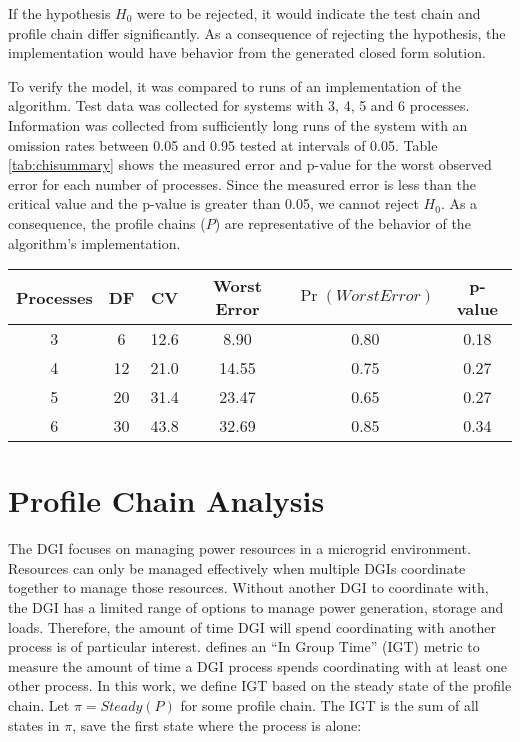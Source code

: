 If the hypothesis $H_{0}$ were to be rejected, it would indicate the test chain and profile chain differ significantly.
As a consequence of rejecting the hypothesis, the implementation would have behavior from the generated closed form solution.

To verify the model, it was compared to runs of an implementation of the algorithm.
Test data was collected for systems with 3, 4, 5 and 6 processes.
Information was collected from sufficiently long runs of the system with an omission rates between 0.05 and 0.95 tested at intervals of 0.05.
Table \ref{tab:chisummary} shows the measured error and p-value for the worst observed error for each number of processes.
Since the measured error is less than the critical value and the p-value is greater than 0.05, we cannot reject $H_0$. 
As a consequence, the profile chains ($P$) are representative of the behavior of the algorithm's implementation.

\begin{table*}[!t]
\centering
\begin{tabular}{ c | c c c c c}
  \hline
  Processes & DF & CV & Worst Error & $\Pr(WorstError)$ &  p-value \\ \hline
  3 & 6 & 12.6 & 8.90 & 0.80 & 0.18 \\
  4 & 12 & 21.0 & 14.55 & 0.75 & 0.27 \\
  5 & 20 & 31.4 & 23.47 & 0.65 & 0.27 \\
  6 & 30 & 43.8 & 32.69 & 0.85 & 0.34 \\
\end{tabular}
\caption{Summary of $\chi^2$ tests performed.}
\label{tab:chisummary}
\end{table*}

\section{Profile Chain Analysis}

The DGI focuses on managing power resources in a microgrid environment.
Resources can only be managed effectively when multiple DGIs coordinate together to manage those resources.
Without another DGI to coordinate with, the DGI has a limited range of options to manage power generation, storage and loads.
Therefore, the amount of time DGI will spend coordinating with another process is of particular interest.
\cite{CRITIS2012} defines an ``In Group Time'' (IGT) metric to measure the amount of time a DGI process spends coordinating with at least one other process.
In this work, we define IGT based on the steady state of the profile chain.
Let $\pi=Steady(P)$ for some profile chain.
The IGT is the sum of all states in $\pi$, save the first state where the process is alone:

